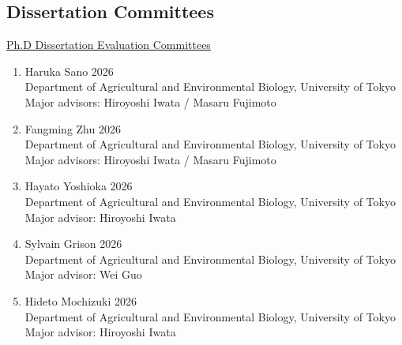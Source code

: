 \documentclass[margin,line,10pt]{res}
\begin{document}
\begin{resume}
\vspace{0.5cm}
\section{\sc Dissertation Committees}

\begin{flushleft}
  \hspace{0.2cm} \underline{Ph.D Dissertation Evaluation Committees}
  \end{flushleft}
  \begin{enumerate}

    \item [8.] Haruka Sano  \hfill 2026 \\
    Department of Agricultural and Environmental Biology,  University of Tokyo \\ 
    Major advisors: Hiroyoshi Iwata / Masaru Fujimoto

\vspace{0.3cm}

    \item [7.] Fangming Zhu  \hfill 2026 \\
    Department of Agricultural and Environmental Biology,  University of Tokyo \\ 
    Major advisors: Hiroyoshi Iwata / Masaru Fujimoto

    \vspace{0.3cm}

    \item [6.] Hayato Yoshioka  \hfill 2026 \\
    Department of Agricultural and Environmental Biology,  University of Tokyo \\ 
    Major advisor: Hiroyoshi Iwata

    \vspace{0.3cm}

    \item [5.] Sylvain Grison  \hfill 2026 \\
    Department of Agricultural and Environmental Biology,  University of Tokyo \\ 
    Major advisor: Wei Guo

    \vspace{0.3cm}

    \item [4.] Hideto Mochizuki \hfill 2026 \\
    Department of Agricultural and Environmental Biology,  University of Tokyo \\ 
    Major advisor: Hiroyoshi Iwata


\end{enumerate}
\end{resume}
\end{document}
